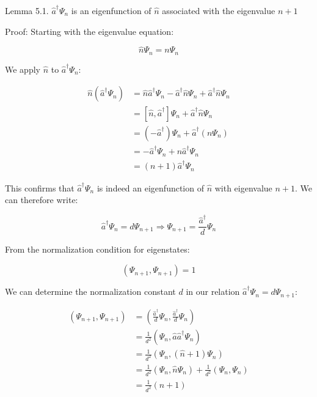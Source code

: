 Lemma 5.1. $\hat{a}^\dagger\Psi_n$ is an eigenfunction of $\hat{n}$ associated with the eigenvalue $n+1$

Proof:
Starting with the eigenvalue equation:

\begin{equation}
\hat{n}\Psi_n = n\Psi_n
\end{equation}

We apply $\hat{n}$ to $\hat{a}^\dagger\Psi_n$:

\begin{align}
\hat{n}(\hat{a}^\dagger\Psi_n) &= \hat{n}\hat{a}^\dagger\Psi_n - \hat{a}^\dagger\hat{n}\Psi_n + \hat{a}^\dagger\hat{n}\Psi_n \\
&= [\hat{n}, \hat{a}^\dagger]\Psi_n + \hat{a}^\dagger\hat{n}\Psi_n \\
&= (-\hat{a}^\dagger)\Psi_n + \hat{a}^\dagger(n\Psi_n)  \\
&= -\hat{a}^\dagger\Psi_n + n\hat{a}^\dagger\Psi_n \\
&= (n+1)\hat{a}^\dagger\Psi_n
\end{align}

This confirms that $\hat{a}^\dagger\Psi_n$ is indeed an eigenfunction of $\hat{n}$ with eigenvalue $n+1$. We can therefore write:

\begin{equation}
\hat{a}^\dagger\Psi_n = d\Psi_{n+1} \Longrightarrow \Psi_{n+1} = \frac{\hat{a}^\dagger}{d}\Psi_n
\end{equation}


From the normalization condition for eigenstates:

\begin{equation}
(\Psi_{n+1}, \Psi_{n+1}) = 1
\end{equation}

We can determine the normalization constant $d$ in our relation $\hat{a}^\dagger\Psi_n = d\Psi_{n+1}$:

\begin{align}
(\Psi_{n+1}, \Psi_{n+1}) &= \left(\frac{\hat{a}^\dagger}{d}\Psi_n, \frac{\hat{a}^\dagger}{d}\Psi_n\right) \\
&= \frac{1}{d^2}(\Psi_n, \hat{a}\hat{a}^\dagger\Psi_n) \\
&= \frac{1}{d^2}(\Psi_n, (\hat{n}+1)\Psi_n)  \\
&= \frac{1}{d^2}(\Psi_n, \hat{n}\Psi_n) + \frac{1}{d^2}(\Psi_n, \Psi_n) \\
&= \frac{1}{d^2}(n+1)
\end{align}


